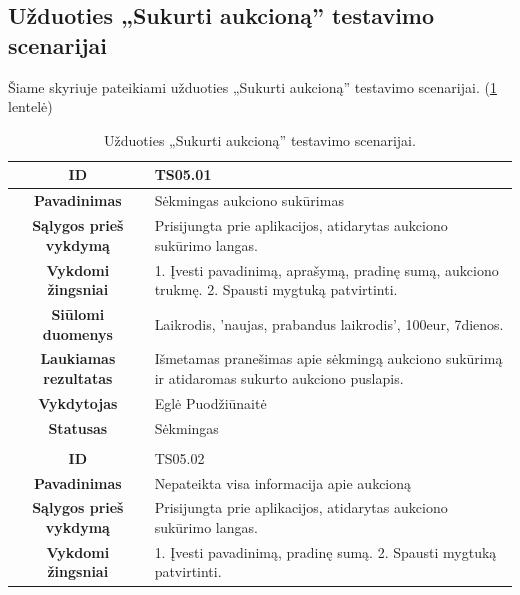 \documentclass{VUMIFPSkursinis}
\begin{document}
			\subsection{Užduoties „Sukurti aukcioną” testavimo scenarijai}
	Šiame skyriuje pateikiami užduoties „Sukurti aukcioną” testavimo scenarijai. (\ref{sukurimas} lentelė)
	\begin{table}[H]
		\caption{Užduoties „Sukurti aukcioną” testavimo scenarijai.}
		\begin{tabular}{|p{6cm}|p{11cm}|}
			\hline
			\multicolumn{1}{|c|}{{\bfseries ID}}&
			{TS05.01}\\
			\hline
			\multicolumn{1}{|c|}{{\bfseries Pavadinimas}}&
			{Sėkmingas aukciono sukūrimas}\\
			\hline
			\multicolumn{1}{|c|}{{\bfseries Sąlygos prieš vykdymą}}&
			{Prisijungta prie aplikacijos, atidarytas aukciono sukūrimo langas.}\\
			\hline
			\multicolumn{1}{|c|}{{\bfseries Vykdomi žingsniai}}&
			{1. Įvesti pavadinimą, aprašymą, pradinę sumą, aukciono trukmę.
			 2. Spausti mygtuką patvirtinti.}\\
			\hline
			\multicolumn{1}{|c|}{{\bfseries Siūlomi duomenys}}&
			{Laikrodis, 'naujas, prabandus laikrodis', 100eur, 7dienos.}\\
			\hline
			\multicolumn{1}{|c|}{{\bfseries Laukiamas rezultatas}}&
			{Išmetamas pranešimas apie sėkmingą aukciono sukūrimą ir atidaromas sukurto aukciono puslapis.}\\
			\hline
			\multicolumn{1}{|c|}{{\bfseries Vykdytojas}}&
			{Eglė Puodžiūnaitė}\\
			\hline
			\multicolumn{1}{|c|}{{\bfseries Statusas}}&
			{Sėkmingas}\\
			\hline
			\rowcolor{lightgray}
			\multicolumn{2}{|c|}{}\\
			\hline
			\multicolumn{1}{|c|}{{\bfseries ID}}&
			{TS05.02}\\
			\hline
			\multicolumn{1}{|c|}{{\bfseries Pavadinimas}}&
			{Nepateikta visa informacija apie aukcioną}\\
			\hline
			\multicolumn{1}{|c|}{{\bfseries Sąlygos prieš vykdymą}}&
			{Prisijungta prie aplikacijos, atidarytas aukciono sukūrimo langas.}\\
			\hline
			\multicolumn{1}{|c|}{{\bfseries Vykdomi žingsniai}}&
			{1. Įvesti pavadinimą, pradinę sumą.
			 2. Spausti mygtuką patvirtinti.}\\
			\hline
			\end{tabular}
		\label{sukurimas}
	\end{table}	
\end{document}
